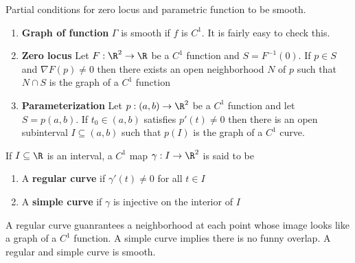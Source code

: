 \documentclass[11pt]{article}
\begin{document}
\begin{theorem*}
  Partial conditions for zero locus and parametric function to be smooth.
  \begin{enumerate}
    \item \textbf{Graph of function} $\Gamma$ is smooth if $f$ is $C^1$. It is fairly easy to check this.
    \item \textbf{Zero locus} Let $F:\R^2 \to \R$ be a $C^1$ function and $S = F^{-1}(0)$. If $p\in S$ and $\nabla F(p)\neq 0$ then there exists an open neighborhood $N$ of $p$ such that $N\cap S$ is the graph of a $C^1$ function
    \item \textbf{Parameterization} Let $p:(a,b)\to \R^2$ be a $C^1$ function and let $S = p(a,b)$. If $t_0 \in (a,b)$ satisfies $p'(t) \neq 0$ then there is an open subinterval $I\subseteq (a,b)$ such that $p(I)$ is the graph of a $C^1$ curve.
  \end{enumerate}

\end{theorem*}

\begin{defn*}
  If $I\subseteq \R$ is an interval, a $C^1$ map $\gamma: I \to \R^2$ is said to be
  \begin{enumerate}
    \item A \textbf{regular curve} if $\gamma'(t)\neq 0$ for all $t\in I$
    \item A \textbf{simple curve} if $\gamma$ is injective on the interior of $I$
  \end{enumerate}
  \begin{rem}
    A regular curve guanrantees a neighborhood at each point whose image looks like a graph of a $C^1$ function. A simple curve implies there is no funny overlap. A regular and simple curve is smooth.
  \end{rem}
\end{defn*}
\end{document}
